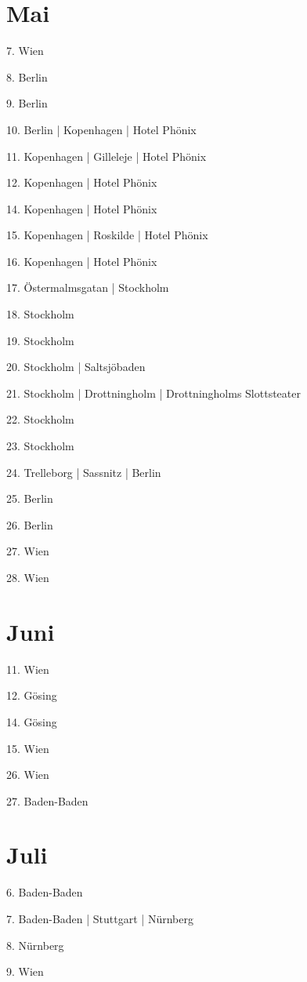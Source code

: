 \documentclass[twoside=false,titlepage=false,open=any, parskip=never, fontsize=10pt, headings=small, chapterprefix=false, appendixprefix=false, DIV=15]{scrbook}
\begin{document}
\begin{multicols}{3}
            \section*{Mai}
            7. Wien\par
            8. Berlin\par
            9. Berlin\par
            10. Berlin | Kopenhagen | Hotel Phönix\par
            11. Kopenhagen | Gilleleje | Hotel Phönix\par
            12. Kopenhagen | Hotel Phönix\par
            14. Kopenhagen | Hotel Phönix\par
            15. Kopenhagen | Roskilde | Hotel Phönix\par
            16. Kopenhagen | Hotel Phönix\par
            17. Östermalmsgatan | Stockholm\par
            18. Stockholm\par
            19. Stockholm\par
            20. Stockholm | Saltsjöbaden\par
            21. Stockholm | Drottningholm | Drottningholms Slottsteater\par
            22. Stockholm\par
            23. Stockholm\par
            24. Trelleborg | Sassnitz | Berlin\par
            25. Berlin\par
            26. Berlin\par
            27. Wien\par
            28. Wien\par
            \section*{Juni}
            11. Wien\par
            12. Gösing\par
            14. Gösing\par
            15. Wien\par
            26. Wien\par
            27. Baden-Baden\par
            \section*{Juli}
            6. Baden-Baden\par
            7. Baden-Baden | Stuttgart | Nürnberg\par
            8. Nürnberg\par
            9. Wien\par

\end{multicols}
\end{document}
